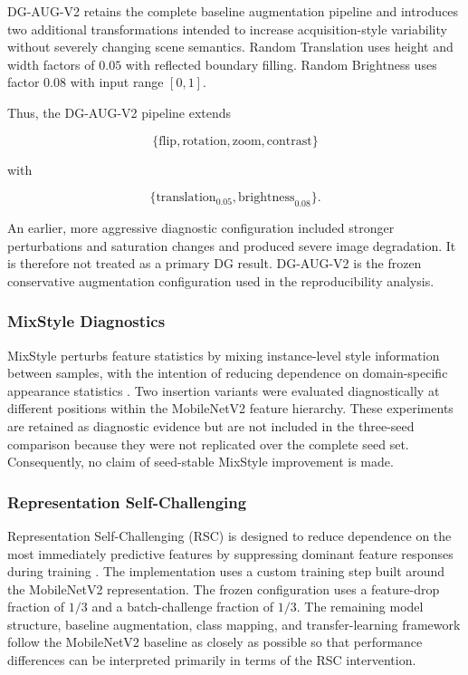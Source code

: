 DG-AUG-V2 retains the complete baseline augmentation pipeline and
introduces two additional transformations intended to increase
acquisition-style variability without severely changing scene semantics.
Random Translation uses height and width factors of \(0.05\) with
reflected boundary filling. Random Brightness uses factor \(0.08\) with
input range \([0,1]\).

Thus, the DG-AUG-V2 pipeline extends

\[
\{\text{flip},\text{rotation},\text{zoom},\text{contrast}\}
\]

with

\[
\{\text{translation}_{0.05},\text{brightness}_{0.08}\}.
\]

An earlier, more aggressive diagnostic configuration included stronger
perturbations and saturation changes and produced severe image
degradation. It is therefore not treated as a primary DG result.
DG-AUG-V2 is the frozen conservative augmentation configuration used in
the reproducibility analysis.

\subsubsection{MixStyle Diagnostics}

MixStyle perturbs feature statistics by mixing instance-level style
information between samples, with the intention of reducing dependence on
domain-specific appearance statistics \cite{zhou2021mixstyle}. Two
insertion variants were evaluated diagnostically at different positions
within the MobileNetV2 feature hierarchy. These experiments are retained
as diagnostic evidence but are not included in the three-seed comparison
because they were not replicated over the complete seed set.
Consequently, no claim of seed-stable MixStyle improvement is made.

\subsubsection{Representation Self-Challenging}

Representation Self-Challenging (RSC) is designed to reduce dependence on
the most immediately predictive features by suppressing dominant feature
responses during training \cite{huang2020rsc}. The implementation uses a
custom training step built around the MobileNetV2 representation. The
frozen configuration uses a feature-drop fraction of \(1/3\) and a
batch-challenge fraction of \(1/3\). The remaining model structure,
baseline augmentation, class mapping, and transfer-learning framework
follow the MobileNetV2 baseline as closely as possible so that performance
differences can be interpreted primarily in terms of the RSC
intervention.

